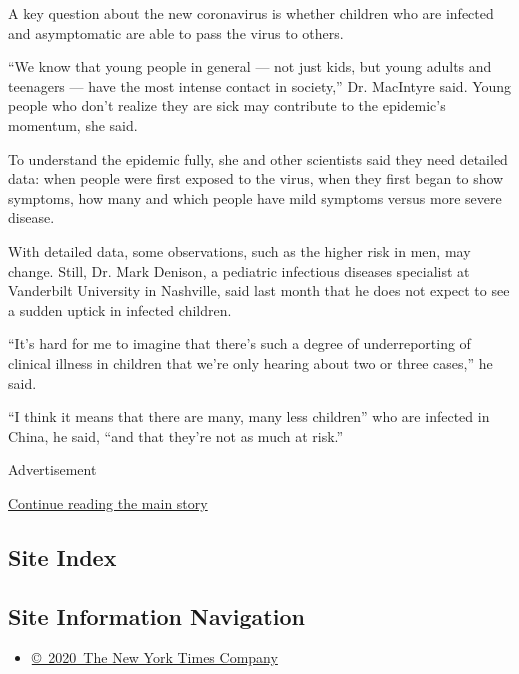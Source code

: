 A key question about the new coronavirus is whether children who are
infected and asymptomatic are able to pass the virus to others.

``We know that young people in general --- not just kids, but young
adults and teenagers --- have the most intense contact in society,'' Dr.
MacIntyre said. Young people who don't realize they are sick may
contribute to the epidemic's momentum, she said.

To understand the epidemic fully, she and other scientists said they
need detailed data: when people were first exposed to the virus, when
they first began to show symptoms, how many and which people have mild
symptoms versus more severe disease.

With detailed data, some observations, such as the higher risk in men,
may change. Still, Dr. Mark Denison, a pediatric infectious diseases
specialist at Vanderbilt University in Nashville, said last month that
he does not expect to see a sudden uptick in infected children.

``It's hard for me to imagine that there's such a degree of
underreporting of clinical illness in children that we're only hearing
about two or three cases,'' he said.

``I think it means that there are many, many less children'' who are
infected in China, he said, ``and that they're not as much at risk.''

Advertisement

\protect\hyperlink{after-bottom}{Continue reading the main story}

\hypertarget{site-index}{%
\subsection{Site Index}\label{site-index}}

\hypertarget{site-information-navigation}{%
\subsection{Site Information
Navigation}\label{site-information-navigation}}

\begin{itemize}
\tightlist
\item
  \href{https://help.nytimes.com/hc/en-us/articles/115014792127-Copyright-notice}{©~2020~The
  New York Times Company}
\end{itemize}

